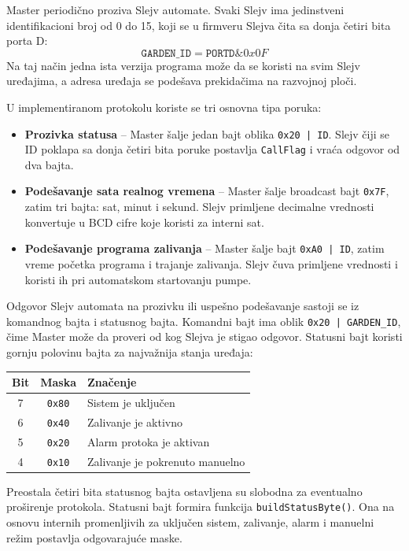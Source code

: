 \documentclass[12pt]{article}
\numberwithin{figure}{section}
\begin{document}
  Master periodično proziva Slejv automate. 
  Svaki Slejv ima jedinstveni identifikacioni broj od 0 do 15, koji se u firmveru Slejva čita sa donja četiri bita porta D:
  \[
    \texttt{GARDEN\_ID} = \texttt{PORTD} \& 0x0F
  \]
  Na taj način jedna ista verzija programa može da se koristi na svim Slejv uređajima, a adresa uređaja se podešava prekidačima na razvojnoj ploči.

  U implementiranom protokolu koriste se tri osnovna tipa poruka:
  \begin{itemize}
    \item{\textbf{Prozivka statusa} -- Master šalje jedan bajt oblika \texttt{0x20 | ID}. Slejv čiji se ID poklapa sa donja četiri bita poruke postavlja \texttt{CallFlag} i vraća odgovor od dva bajta.}
    \item{\textbf{Podešavanje sata realnog vremena} -- Master šalje broadcast bajt \texttt{0x7F}, zatim tri bajta: sat, minut i sekund. Slejv primljene decimalne vrednosti konvertuje u BCD cifre koje koristi za interni sat.}
    \item{\textbf{Podešavanje programa zalivanja} -- Master šalje bajt \texttt{0xA0 | ID}, zatim vreme početka programa i trajanje zalivanja. Slejv čuva primljene vrednosti i koristi ih pri automatskom startovanju pumpe.}
  \end{itemize}

  Odgovor Slejv automata na prozivku ili uspešno podešavanje sastoji se iz komandnog bajta i statusnog bajta. 
  Komandni bajt ima oblik \texttt{0x20 | GARDEN\_ID}, čime Master može da proveri od kog Slejva je stigao odgovor. 
  Statusni bajt koristi gornju polovinu bajta za najvažnija stanja uređaja:

  \begin{center}
  \begin{tabular}{|c|c|m{8cm}|}
    \hline
    Bit & Maska & Značenje \\ \hline
    7 & \texttt{0x80} & Sistem je uključen \\ \hline
    6 & \texttt{0x40} & Zalivanje je aktivno \\ \hline
    5 & \texttt{0x20} & Alarm protoka je aktivan \\ \hline
    4 & \texttt{0x10} & Zalivanje je pokrenuto manuelno \\ \hline
  \end{tabular}
  \end{center}

  Preostala četiri bita statusnog bajta ostavljena su slobodna za eventualno proširenje protokola.
  Statusni bajt formira funkcija \texttt{buildStatusByte()}. 
  Ona na osnovu internih promenljivih za uključen sistem, zalivanje, alarm i manuelni režim postavlja odgovarajuće maske.
\end{document}
